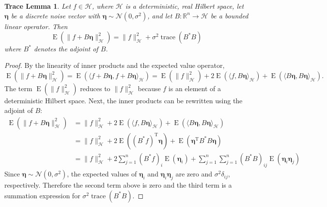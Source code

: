 \documentclass[12pt]{article}
\newcommand{\trans}{\mathrm{T}}	%
\newcommand{\trace}{\operatorname{trace}}	%
\newcommand{\noiseSD}{\sigma}	%
\newcommand{\noise}{\bm{\eta}}	%
\newcommand{\E}{\operatorname{E}}	%
\newtheorem*{TL}{Trace Lemma}
\begin{document}
\begin{TL}
Let $f \in \mathcal{H}$, where $\mathcal{H}$ is a deterministic, real Hilbert space, let $\noise$ be a discrete noise vector with $\noise \sim \mathcal{N}(0,\noiseSD^2)$, and let $B: \mathbb{R}^n \rightarrow \mathcal{H}$ be a bounded linear operator. Then
\[\E(\|f + B\noise\|_{\mathcal{H}}^2) = \|f\|_{\mathcal{H}}^2 + \noiseSD^2\trace({B^*}B)\]
where $B^*$ denotes the adjoint of $B$.
\end{TL}
\begin{proof}
By the linearity of inner products and the expected value operator,
\[\E(\|f + B\noise\|_{\mathcal{H}}^2) = \E(\langle f + B\noise, f + B\noise\rangle_{\mathcal{H}}) = \E(\|f\|_{\mathcal{H}}^2) + 2\E(\langle f, B\noise\rangle_{\mathcal{H}}) + \E(\langle B\noise, B\noise\rangle_{\mathcal{H}}).\]
The term $\E(\|f\|_{\mathcal{H}}^2)$ reduces to $\|f\|_{\mathcal{H}}^2$ because $f$ is an element of a deterministic Hilbert space. Next, the inner products can be rewritten using the adjoint of $B$:
\begin{align*}
\E(\|f + B\noise\|_{\mathcal{H}}^2) &= \|f\|_{\mathcal{H}}^2 + 2\E(\langle f, B\noise\rangle_{\mathcal{H}}) + \E(\langle B\noise, B\noise\rangle_{\mathcal{H}}) \\
&= \|f\|_{\mathcal{H}}^2 + 2\E(({B^*}f)^\trans\noise) + \E({\noise^\trans}{B^*}B\noise) \\
&= \|f\|_{\mathcal{H}}^2 + 2\sum_{j=1}^n ({B^*}f)_i \E(\noise_i) + \sum_{j=1}^n\sum_{j=1}^n ({B^*}B)_{ij} \E({\noise_i}{\noise_j})
\end{align*}
Since $\noise \sim \mathcal{N}(0,\noiseSD^2)$, the expected values of $\noise_i$ and ${\noise_i}{\noise_j}$ are zero and $\noiseSD^2\delta_{ij}$, respectively. Therefore the second term above is zero and the third term is a summation expression for $\noiseSD^2\trace({B^*}B)$.
\end{proof}
\end{document}
